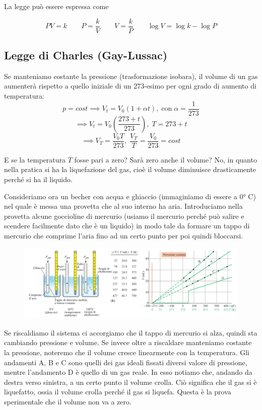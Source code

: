 La legge può essere espressa come

$$PV=k \qquad P=\frac{k}{V} \qquad V=\frac{k}{P} \qquad \log{V} = \log{k} - \log{P}$$

\subsection{Legge di Charles (Gay-Lussac)}
Se manteniamo costante la pressione (trasformazione isobara), il volume di un gas aumenterà rispetto a quello iniziale di un 273-esimo per ogni grado di aumento di temperatura:
$$p=cost \implies V_t=V_0(1 + \alpha t), \; \text{con} \; \alpha=\frac{1}{273}$$
$$\implies V_t=V_0 \left( \frac{273 + t}{273} \right), \; T=273 + t$$
$$\implies V_T = \frac{V_0 T}{273}, \; \frac{V_T}{T}=\frac{V_0}{273}=cost$$

E se la temperatura $T$ fosse pari a zero? Sarà zero anche il volume? No, in quanto nella pratica si ha la liquefazione del gas, cioè il volume diminuisce drasticamente perché si ha il liquido.

\vspace{0.2cm}Consideriamo ora un becher con acqua e ghiaccio (immaginiamo di essere a 0° C) nel quale è messa una provetta che al suo interno ha aria. Introduciamo nella provetta alcune goccioline di mercurio (usiamo il mercurio perché può salire e scendere facilmente dato che è un liquido) in modo tale da formare un tappo di mercurio che comprime l'aria fino ad un certo punto per poi quindi bloccarsi.

\begin{figure}[htp]
    \centering
    \includegraphics[width=15cm]{immagini/esperimento_provetta.png}
\end{figure}

Se riscaldiamo il sistema ci accorgiamo che il tappo di mercurio si alza, quindi sta cambiando pressione e volume. Se invece oltre a riscaldare manteniamo costante la pressione, noteremo che il volume cresce linearmente con la temperatura. Gli andamenti A, B e C sono quelli dei gas ideali fissati diversi valore di pressione, mentre l'andamento D è quello di un gas reale. In esso notiamo che, andando da destra verso sinistra, a un certo punto il volume crolla. Ciò significa che il gas si è liquefatto, ossia il volume crolla perché il gas si liquefa. Questa è la prova sperimentale che il volume non va a zero.
